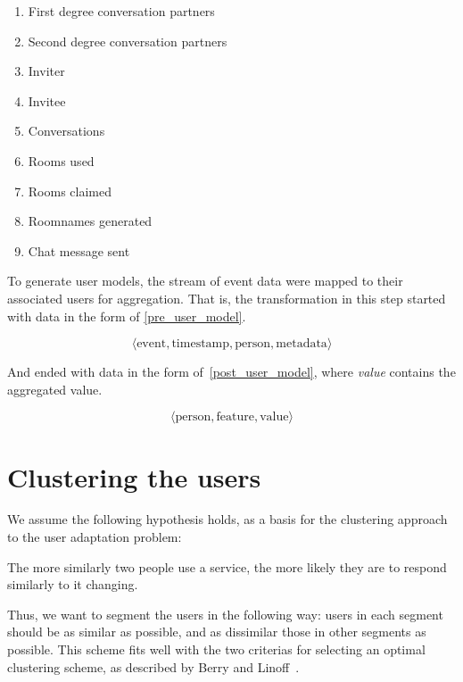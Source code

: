 \begin{enumerate}
  \item First degree conversation partners
  \item Second degree conversation partners
  \item Inviter
  \item Invitee
  \item Conversations
  \item Rooms used
  \item Rooms claimed
  \item Roomnames generated
  \item Chat message sent
\end{enumerate}

To generate user models, the stream of event data were mapped to their associated users for aggregation. That is, the transformation in this step started with data in the form of \eqref{pre_user_model}.

\begin{equation}
  \langle \text{event}, \text{timestamp}, \text{person}, \text{metadata} \rangle
  \label{pre_user_model}
\end{equation}

And ended with data in the form of~\eqref{post_user_model}, where \emph{value} contains the aggregated value.

\begin{equation}
  \langle \text{person}, \text{feature}, \text{value} \rangle
  \label{post_user_model}
\end{equation}

\section{Clustering the users}
\label{approach:sec:clustering}

We assume the following hypothesis holds, as a basis for the clustering approach to the user adaptation problem:

\begin{hypothesis}
The more similarly two people use a service, the more likely they are to respond similarly to it changing.
\end{hypothesis}

Thus, we want to segment the users in the following way: users in each segment should be as similar as possible, and as dissimilar those in other segments as possible. This scheme fits well with the two criterias for selecting an optimal clustering scheme, as described by Berry and Linoff~\cite{Berry1997}.

